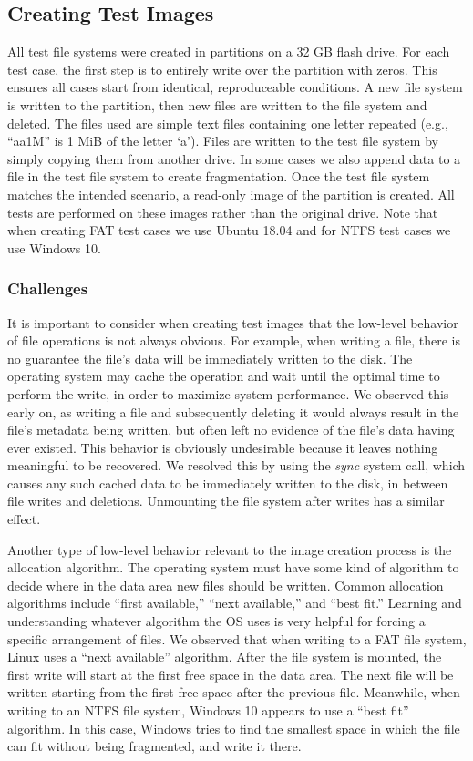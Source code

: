 \subsection{Creating Test Images}
All test file systems were created in partitions on a 32 GB flash drive. For each test case, the first step is to entirely write over the partition with zeros. This ensures all cases start from identical, reproduceable conditions. A new file system is written to the partition, then new files are written to the file system and deleted. The files used are simple text files containing one letter repeated (e.g., ``aa1M'' is 1 MiB of the letter `a'). Files are written to the test file system by simply copying them from another drive. In some cases we also append data to a file in the test file system to create fragmentation. Once the test file system matches the intended scenario, a read-only image of the partition is created. All tests are performed on these images rather than the original drive. Note that when creating FAT test cases we use Ubuntu 18.04 and for NTFS test cases we use Windows 10.

\subsubsection{Challenges}
It is important to consider when creating test images that the low-level behavior of file operations is not always obvious. For example, when writing a file, there is no guarantee the file's data will be immediately written to the disk. The operating system may cache the operation and wait until the optimal time to perform the write, in order to maximize system performance. We observed this early on, as writing a file and subsequently deleting it would always result in the file's metadata being written, but often left no evidence of the file's data having ever existed. This behavior is obviously undesirable because it leaves nothing meaningful to be recovered. We resolved this by using the \emph{sync} system call, which causes any such cached data to be immediately written to the disk, in between file writes and deletions. Unmounting the file system after writes has a similar effect.

Another type of low-level behavior relevant to the image creation process is the allocation algorithm. The operating system must have some kind of algorithm to decide where in the data area new files should be written. Common allocation algorithms include ``first available,'' ``next available,'' and ``best fit.''
Learning and understanding whatever algorithm the OS uses is very helpful for forcing a specific arrangement of files. We observed that when writing to a FAT file system, Linux uses a ``next available'' algorithm. After the file system is mounted, the first write will start at the first free space in the data area. The next file will be written starting from the first free space after the previous file.
Meanwhile, when writing to an NTFS file system, Windows 10 appears to use a ``best fit'' algorithm. In this case, Windows tries to find the smallest space in which the file can fit without being fragmented, and write it there.

